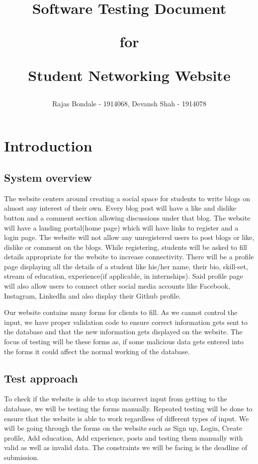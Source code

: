 \documentclass[12pt]{article}
\title{Software Testing Document

for

Student Networking Website}
\author{Rajas Bondale - 1914068, Devansh Shah - 1914078}
\begin{document}
\maketitle
\pagebreak
\tableofcontents
\pagebreak
\section{Introduction}
\subsection{System overview}
The website centers around creating a social space for students to write blogs on almost any interest of their own. Every blog post will have a like and dislike button and a comment section allowing discussions under that blog.
The website will have a landing portal(home page) which will have links to register and a login page. The website will not allow any unregistered users to post blogs or like, dislike or comment on the blogs. While registering, students will be asked to fill details appropriate for the website to increase connectivity.
There will be a profile page displaying all the details of a student like his/her name, their bio, skill-set, stream of education, experience(if applicable, in internships). Said profile page will also allow users to connect other social media accounts like Facebook, Instagram, LinkedIn and also display their Github profile.

\par 
Our website contains many forms for clients to fill. As we cannot control the input, we have proper validation code to ensure correct information gets sent to the database and that the new information gets displayed on the website. The focus of testing will be these forms as, if some malicious data gets entered into the forms it could affect the normal working of the database.
    
\subsection{Test approach}
To check if the website is able to stop incorrect input from getting to the database, we will be testing the forms manually. Repeated testing will be done to ensure that the website is able to work regardless of different types of input.
We will be going through the forms on the website such as Sign up, Login, Create profile, Add education, Add experience, posts and testing them manually with valid as well as invalid data. The constraints we will be facing is the deadline of submission.
\end{document}
